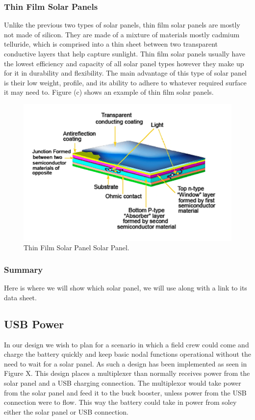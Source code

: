 \subsubsection{Thin Film Solar Panels}

Unlike the previous two types of solar panels, thin film solar panels are mostly not made of silicon. They are made of a mixture of materials mostly cadmium telluride, which is comprised into a thin sheet between two transparent conductive layers that help capture sunlight. Thin film solar panels usually have the lowest efficiency and capacity of all solar panel types however they make up for it in durability and flexibility. The main advantage of this type of solar panel is their low weight, profile, and its ability to adhere to whatever required surface it may need to. Figure (c) shows an example of thin film solar panels. 
\begin{figure}
    \centering
    \includegraphics[scale=0.5]{figures/thin film solar.png}
    \caption{Thin Film Solar Panel Solar Panel.}
    \label{solar-panel-overview} 
\end{figure}
\subsubsection{Summary}

Here is where we will show which solar panel, we will use along with a link to its data sheet. 


\subsection{USB Power}
In our design we wish to plan for a scenario in which a field crew could come and charge the battery quickly and keep basic nodal functions operational without the need to wait for a solar panel. As such a design has been implemented as seen in Figure X. This design places a multiplexer than normally receives power from the solar panel and a USB charging connection. The multiplexor would take power from the solar panel and feed it to the buck booster, unless power from the USB connection were to flow. This way the battery could take in power from soley either the solar panel or USB connection.
